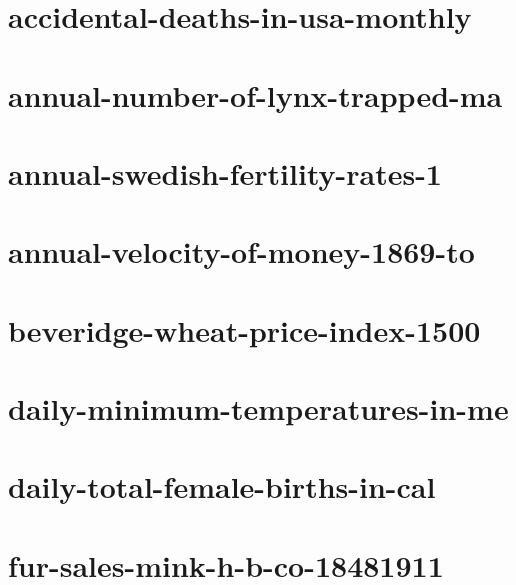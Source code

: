\documentclass[twoside]{article}
\begin{document}
\section{accidental-deaths-in-usa-monthly}

    

\section{annual-number-of-lynx-trapped-ma}

    

\section{annual-swedish-fertility-rates-1}

    

\section{annual-velocity-of-money-1869-to}

    

\section{beveridge-wheat-price-index-1500}

    

\section{daily-minimum-temperatures-in-me}

    

\section{daily-total-female-births-in-cal}

    

\section{fur-sales-mink-h-b-co-18481911}
\end{document}
